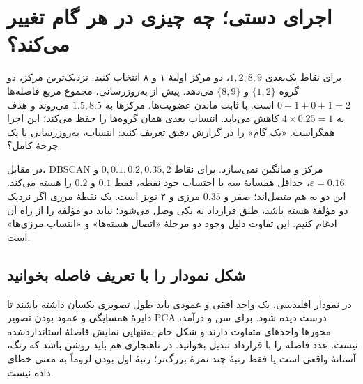 \documentclass[12pt,a4paper,oneside]{report}
\begin{document}
\section{اجرای دستی؛ چه چیزی در هر گام تغییر می‌کند؟}
برای نقاط یک‌بعدی $1,2,8,9$، دو مرکز اولیهٔ ۱ و ۸ انتخاب کنید. نزدیک‌ترین مرکز، دو گروه $\{1,2\}$ و $\{8,9\}$ می‌دهد. پیش از به‌روزرسانی، مجموع مربع فاصله‌ها $0+1+0+1=2$ است. با ثابت ماندن عضویت‌ها، مرکزها به $1.5,8.5$ می‌روند و هدف به $4\times0.25=1$ کاهش می‌یابد. انتساب بعدی همان گروه‌ها را حفظ می‌کند؛ این اجرا همگراست. «یک گام» را در گزارش دقیق تعریف کنید: انتساب، به‌روزرسانی یا یک چرخهٔ کامل؟

در مقابل، DBSCAN مرکز و میانگین نمی‌سازد. برای نقاط $0,0.1,0.2,0.35,2$ و $\varepsilon=0.16$، حداقل همسایهٔ سه با احتساب خود نقطه، فقط $0.1$ و $0.2$ را هسته می‌کند. این دو به هم متصل‌اند؛ صفر و $0.35$ مرزی و ۲ نویز است. یک نقطهٔ مرزی اگر نزدیک دو مؤلفهٔ هسته باشد، طبق قرارداد به یکی وصل می‌شود؛ نباید دو مؤلفه را از راه آن ادغام کنیم. این تفاوت دلیل وجود دو مرحلهٔ «اتصال هسته‌ها» و «انتساب مرزی‌ها» است.

\subsection*{شکل نمودار را با تعریف فاصله بخوانید}
در نمودار اقلیدسی، یک واحد افقی و عمودی باید طول تصویری یکسان داشته باشند تا دایرهٔ همسایگی و عمود بودن تصویر PCA درست دیده شود. برای سن و درآمد، محورها واحدهای متفاوت دارند و شکل خام به‌تنهایی نمایش فاصلهٔ استانداردشده نیست. عدد فاصله را با قرارداد تبدیل بخوانید. در ناهنجاری هم باید روشن باشد که رنگ، آستانهٔ واقعی است یا فقط رتبهٔ چند نمرهٔ بزرگ‌تر؛ رتبهٔ اول بودن لزوماً به معنی خطای داده نیست.
\end{document}
